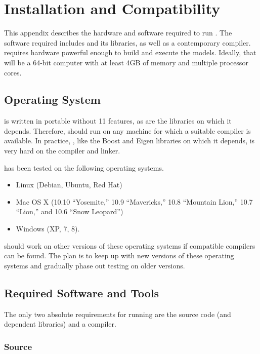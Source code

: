 \chapter{Installation and Compatibility}\label{install.appendix}

\noindent
This appendix describes the hardware and software required to run
\CmdStan.  The software required includes \CmdStan and its libraries,
as well as a contemporary \Cpp compiler.  \CmdStan requires hardware
powerful enough to build and execute the models.  Ideally, that will
be a 64-bit computer with at least 4GB of memory and multiple
processor cores.

\section{Operating System}

\CmdStan is written in portable \Cpp without {\Cpp}11 features, as are the
libraries on which it depends.  Therefore, \CmdStan should run on any machine
for which a suitable \Cpp compiler is available.  In practice, \CmdStan,
like the Boost and Eigen libraries on which it depends, is very hard
on the compiler and linker.

\CmdStan has been tested on the following operating systems.
%
\begin{itemize}
\item Linux (Debian, Ubuntu, Red Hat)
\item Mac OS X (10.10 ``Yosemite,'' 10.9 ``Mavericks,'' 10.8
  ``Mountain Lion,'' 10.7 ``Lion,'' and 10.6 ``Snow Leopard'')
\item Windows (XP, 7, 8).
\end{itemize}
%
\CmdStan should work on other versions of these operating systems if
compatible \Cpp compilers can be found.  The plan is to keep up with
new versions of these operating systems and gradually phase out
testing on older versions.

\section{Required Software and Tools}

The only two absolute requirements for running \CmdStan are the
\CmdStan source code (and dependent libraries) and a \Cpp compiler.

\subsection{\CmdStan Source}

